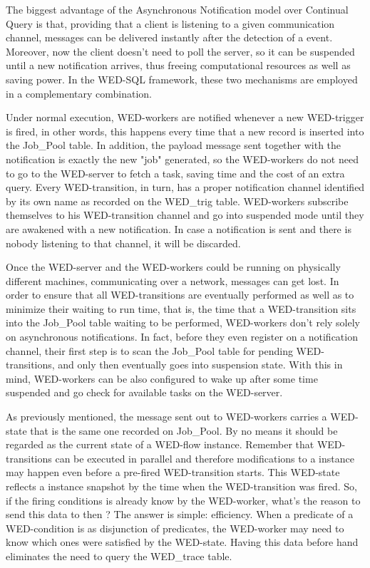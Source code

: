 \documentclass[12pt]{article}
\begin{document}
\par The biggest advantage of the Asynchronous Notification model over Continual Query is that, providing that a client is  listening to a given communication channel, messages can be delivered instantly after the detection of a event. Moreover, now the client doesn't need to poll the server, so it can be suspended until a new notification arrives, thus freeing 
computational resources as well as saving power. In the WED-SQL framework, these two mechanisms are employed in a complementary combination. 

\par Under normal execution, WED-workers are notified whenever a new WED-trigger is fired, in other words, this happens  every time that a new record is inserted into the Job\_Pool table. In addition, the payload message sent together with the notification is exactly the new "job" generated, so the WED-workers do not need to go to the WED-server to fetch a task, saving time and the cost of an extra query. Every WED-transition, in turn, has a proper notification channel identified by its own name as recorded on the WED\_trig table. WED-workers subscribe themselves to his WED-transition channel and  go into suspended mode until they are awakened with a new notification. In case a notification is sent and there is nobody listening to that channel, it will be discarded.  

\par Once the WED-server and the WED-workers could be running on physically different machines, communicating over a network,  messages can get lost. In order to ensure that all WED-transitions are eventually performed as well as to minimize their waiting to run time,
that is, the time that a WED-transition sits into the Job\_Pool table waiting to be performed, WED-workers don't rely solely on asynchronous notifications. In fact, before they even register on a notification channel, their first step is to scan the Job\_Pool table for pending WED-transitions, and only then eventually goes into suspension state. With this in mind,
WED-workers can be also configured to wake up after some time suspended and go check for available tasks on the WED-server.

\par As previously mentioned, the message sent out to WED-workers carries a WED-state that is the same one recorded on Job\_Pool. By no means it should be regarded as the current state of a WED-flow instance. Remember that WED-transitions can be executed
in parallel and therefore modifications to a instance may happen even before a pre-fired WED-transition starts. This WED-state reflects a instance snapshot by the time when the WED-transition was fired. So, if the firing conditions is already know by  the WED-worker, what's the reason to send this data to then ? The answer is simple: efficiency. When a predicate of a  WED-condition is as disjunction of predicates, the WED-worker may need to know which ones were satisfied by the WED-state. Having this data before hand eliminates the need to query the WED\_trace table.
\end{document}
